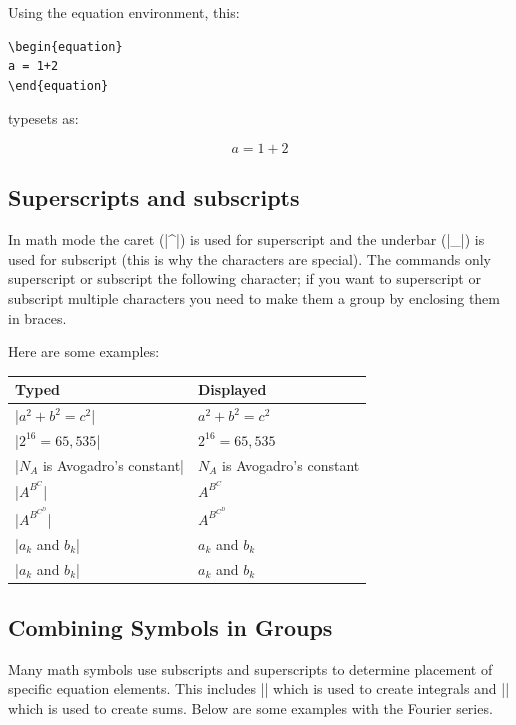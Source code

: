 Using the equation environment, this:

\begin{Verbatim}
\begin{equation}
a = 1+2
\end{equation}
\end{Verbatim}

typesets as:

\begin{equation}
a = 1+2
\end{equation}



\subsection{Superscripts and subscripts}
In math mode the caret (|^|) is used for superscript and the
underbar (|_|) is used for subscript (this is why the characters are
special). The commands only superscript or subscript the following
character; if you want to superscript or subscript multiple characters
you need to make them a group by enclosing them in braces.

Here are some examples:

\begin{center}
\begin{tabular}{l|l}
Typed                   & Displayed\\\hline
|$a^2+b^2=c^2$|         & $a^2+b^2=c^2$\\
|$2^{16}=65,535$|       & $2^{16}=65,535$\\
|$N_A$ is Avogadro's constant| & $N_A$ is Avogadro's constant \\
|$A^{B^C}$|             & $A^{B^C}$\\
|$A^{B^{C^D}}$|             & $A^{B^{C^D}}$\\
|$a_k$ and $b_k$|       & $a_k$ and $b_k$         \\
|$a_k$ and $b_k$|               & $a_k$ and $b_k$ \\
\end{tabular}
\end{center}

\subsection{Combining Symbols in Groups}

Many math symbols use subscripts and superscripts to determine
placement of specific equation elements.  This includes |\int| which is used to create integrals
and |\sum| which is used to create sums. Below are some examples with the Fourier series.

